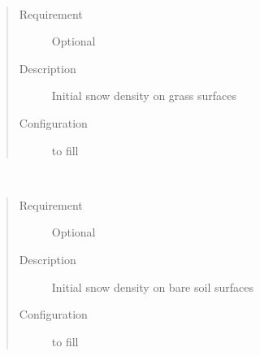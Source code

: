 \documentclass[letterpaper,10pt,english]{sphinxmanual}
\begin{document}

\begin{fulllineitems}
\label{\detokenize{input_files/Initial_Conditions/Snow_related_parameters:cmdoption-arg-snowdensgrass}}~\begin{quote}\begin{description}
\item[{Requirement}] \leavevmode
Optional

\item[{Description}] \leavevmode
Initial snow density on grass surfaces

\item[{Configuration}] \leavevmode
to fill

\end{description}\end{quote}

\end{fulllineitems}


\begin{fulllineitems}
\label{\detokenize{input_files/Initial_Conditions/Snow_related_parameters:cmdoption-arg-snowdensbsoil}}~\begin{quote}\begin{description}
\item[{Requirement}] \leavevmode
Optional

\item[{Description}] \leavevmode
Initial snow density on bare soil surfaces

\item[{Configuration}] \leavevmode
to fill

\end{description}\end{quote}

\end{fulllineitems}

\end{document}

